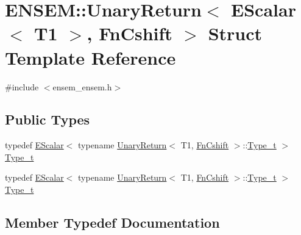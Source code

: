 \hypertarget{structENSEM_1_1UnaryReturn_3_01EScalar_3_01T1_01_4_00_01FnCshift_01_4}{}\section{E\+N\+S\+EM\+:\+:Unary\+Return$<$ E\+Scalar$<$ T1 $>$, Fn\+Cshift $>$ Struct Template Reference}
\label{structENSEM_1_1UnaryReturn_3_01EScalar_3_01T1_01_4_00_01FnCshift_01_4}


{\ttfamily \#include $<$ensem\+\_\+ensem.\+h$>$}

\subsection*{Public Types}
\begin{DoxyCompactItemize}
\item 
typedef \mbox{\hyperlink{classENSEM_1_1EScalar}{E\+Scalar}}$<$ typename \mbox{\hyperlink{structENSEM_1_1UnaryReturn}{Unary\+Return}}$<$ T1, \mbox{\hyperlink{structENSEM_1_1FnCshift}{Fn\+Cshift}} $>$\+::\mbox{\hyperlink{structENSEM_1_1UnaryReturn_3_01EScalar_3_01T1_01_4_00_01FnCshift_01_4_accaabe891d4db03e846c40927db5ad5e}{Type\+\_\+t}} $>$ \mbox{\hyperlink{structENSEM_1_1UnaryReturn_3_01EScalar_3_01T1_01_4_00_01FnCshift_01_4_accaabe891d4db03e846c40927db5ad5e}{Type\+\_\+t}}
\item 
typedef \mbox{\hyperlink{classENSEM_1_1EScalar}{E\+Scalar}}$<$ typename \mbox{\hyperlink{structENSEM_1_1UnaryReturn}{Unary\+Return}}$<$ T1, \mbox{\hyperlink{structENSEM_1_1FnCshift}{Fn\+Cshift}} $>$\+::\mbox{\hyperlink{structENSEM_1_1UnaryReturn_3_01EScalar_3_01T1_01_4_00_01FnCshift_01_4_accaabe891d4db03e846c40927db5ad5e}{Type\+\_\+t}} $>$ \mbox{\hyperlink{structENSEM_1_1UnaryReturn_3_01EScalar_3_01T1_01_4_00_01FnCshift_01_4_accaabe891d4db03e846c40927db5ad5e}{Type\+\_\+t}}
\end{DoxyCompactItemize}


\subsection{Member Typedef Documentation}
\mbox{\label{structENSEM_1_1UnaryReturn_3_01EScalar_3_01T1_01_4_00_01FnCshift_01_4_accaabe891d4db03e846c40927db5ad5e}} 
